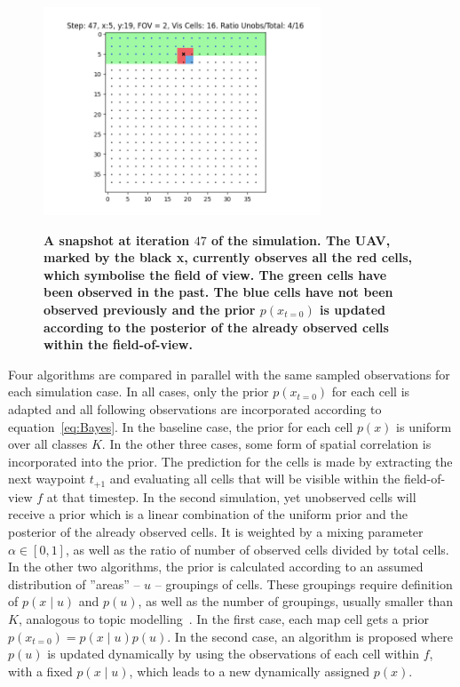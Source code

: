 \documentclass[twocolumn,letterpaper]{IEEEAerospaceCLS}  %
\begin{document}
\begin{figure}
    \centering
    \includegraphics[width=3.25in]{47.png}\\
    \caption{\bf{A snapshot at iteration $47$ of the simulation. The UAV, marked by the black x, currently observes all the red cells, which symbolise the field of view. The green cells have been observed in the past. The blue cells have not been observed previously and the prior $p(x_{t=0})$ is updated according to the posterior of the already observed cells within the field-of-view.}}
    \label{fig:Sim}
\end{figure}
Four algorithms are compared in parallel with the same sampled observations for each simulation case. In all cases, only the prior $p(x_{t=0})$ for each cell is adapted and all following observations are incorporated according to equation~\ref{eq:Bayes}. In the baseline case, the prior for each cell $p(x)$ is uniform over all classes $K$. In the other three cases, some form of spatial correlation is incorporated into the prior. The prediction for the cells is made by extracting the next waypoint $t_{+1}$ and evaluating all cells that will be visible within the field-of-view $f$ at that timestep. In the second simulation, yet unobserved cells will receive a prior which is a linear combination of the uniform prior and the posterior of the already observed cells. It is weighted by a mixing parameter $\alpha \in [0, 1]$, as well as the ratio of number of observed cells divided by total cells.\\
In the other two algorithms, the prior is calculated according to an assumed distribution of ''areas'' -- $u$ -- groupings of cells. These groupings require definition of $p(x\mid u)$ and $p(u)$, as well as the number of groupings, usually smaller than $K$, analogous to topic modelling~\cite{blei_latent_2003}. In the first case, each map cell gets a prior $p(x_{t=0}) = p(x\mid u)p(u)$. In the second case, an algorithm is proposed where $p(u)$ is updated dynamically by using the observations of each cell within $f$, with a fixed $p(x\mid u)$, which leads to a new dynamically assigned $p(x)$.\\
\end{document}
